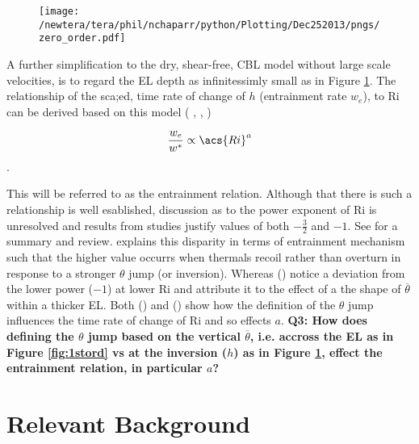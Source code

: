 \begin{figure}[htbp]
    \centering
    \texttt{[image: /newtera/tera/phil/nchaparr/python/Plotting/Dec252013/pngs/zero\_order.pdf]}
    \caption{}
    \label{fig:0order}   %
\end{figure}

A further simplification to the dry, shear-free, \acs{CBL} model without large scale velocities, is to regard the \acs{EL} depth as infinitessimly small as in Figure \ref{fig:0order}.  The relationship of the sca;ed, time rate of change of $h$ (entrainment rate $w_{e}$), to \acs{Ri} can be derived based on this model (\citeauthor{Tennekes73} \citeyear{Tennekes73}, \citeauthor{Deardorff79} \citeyear{Deardorff79}, \citeauthor{FedConzMir04} \citeyear{FedConzMir04})

\begin{equation}
\frac{w_{e}}{w^{*}} \propto  \acs{Ri}^{a}
\end{equation}.
 
This will be referred to as the entrainment relation.  Although that there is such a relationship is well esablished, discussion as to the power exponent of \acs{Ri} is unresolved and results from studies justify values of both $-\frac{3}{2}$ and $-1$. See \citeauthor{Traum11} \citeyear{Traum11} for a summary and review.  \citeauthor{Turner86} \citeyear{Turner86} explains this disparity in terms of entrainment mechanism such that the higher value occurrs when thermals recoil rather than overturn in response to a stronger $\theta$ jump (or inversion).  Whereas \citeauthor{SullMoengStev} (\citeyear{SullMoengStev}) notice a deviation from the lower power ($-1$) at lower \acs{Ri} and attribute it to the effect of a the shape of $\overline{\theta}$ within a thicker \acs{EL}.  Both \citeauthor{FedConzMir04} (\citeyear{FedConzMir04}) and \citeauthor{GarciaMellado} (\citeyear{GarciaMellado}) show how the definition of the $\theta$ jump influences the time rate  of change of \acs{Ri} and so effects $a$. \textbf{Q3: How does defining the $\theta$ jump based on the vertical $\overline{\theta}$, i.e. accross the \acs{EL} as in Figure \ref{fig:1stord} vs at the inversion ($h$) as in Figure \ref{fig:0order}, effect the entrainment relation, in particular $a$?}\\


\section{Relevant Background}
\label{sec:}
